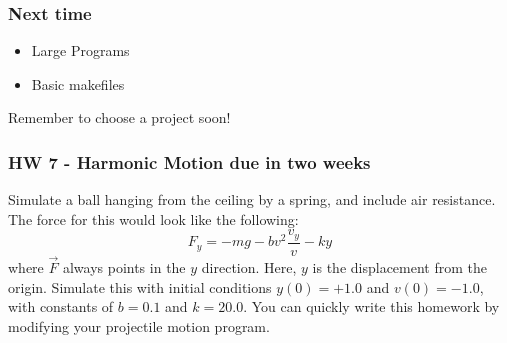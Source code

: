 \documentclass{beamer}
\begin{document}
\begin{frame}
  \frametitle{Next time}
  \begin{itemize}
  \item Large Programs
  \item Basic makefiles
  \end{itemize}
  Remember to choose a project soon!
\end{frame}

\begin{frame}
  \frametitle{HW 7 - Harmonic Motion due in two weeks}
  Simulate a ball hanging from the ceiling by a spring, 
  and include air resistance.
  The force for this would look like the following:
  \begin{equation*}
    F_y = -mg - bv^2\frac{v_y}{v} - ky
  \end{equation*}
  where $\vec{F}$ always points in the $y$ direction. Here,
  $y$ is the displacement from the origin.
  Simulate this with initial conditions $y(0)=+1.0$ and $v(0)=-1.0$, 
  with constants of $b=0.1$ and $k = 20.0$.
  You can quickly write this homework by modifying your projectile motion
  program.
\end{frame}
\end{document}

